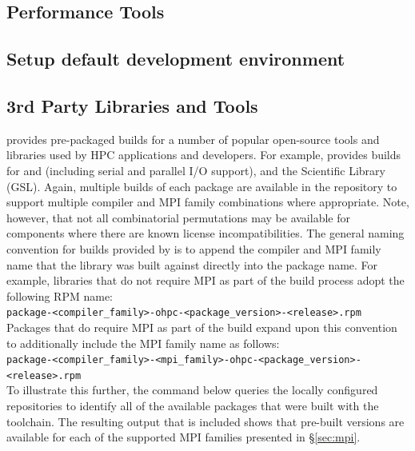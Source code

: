 \documentclass[letterpaper]{article}
\begin{document}
\subsection{Performance Tools} \label{sec:install_perf_tools}


\subsection{Setup default development environment}


\subsection{3rd Party Libraries and Tools} \label{sec:3rdparty}

\OHPC{} provides pre-packaged builds for a number of popular open-source
tools and libraries used by HPC applications and developers. For
example, \OHPC{} provides builds for \FFTW{} and \hdffive{} (including serial and parallel
I/O support), and the \GNU{} Scientific Library (GSL). Again, multiple builds of
each package are available in the \OHPC{} repository to support multiple compiler
and MPI family combinations where appropriate. Note, however, that not all
combinatorial permutations may be available for components where there are known
license incompatibilities. The general naming convention
for builds provided by \OHPC{} is to append the compiler and MPI family name that
the library was built against directly into the package name. For example,
libraries that do not require MPI as part of the build process adopt the
following RPM name: \\

\noindent
\texttt{package-<compiler\_family>-ohpc-<package\_version>-<release>.rpm} \\

\noindent Packages that do require MPI as part of the build expand upon this convention to
additionally include the MPI family name as follows: \\

\noindent
\texttt{package-<compiler\_family>-<mpi\_family>-ohpc-<package\_version>-<release>.rpm} \\

To illustrate this further, the command below queries the locally configured
repositories to identify all of the available \FFTW{} packages that were built
with the \GNU{} toolchain. The resulting output that is included shows that
pre-built versions are available for each of the supported MPI families
presented in \S\ref{sec:mpi}.
\end{document}
